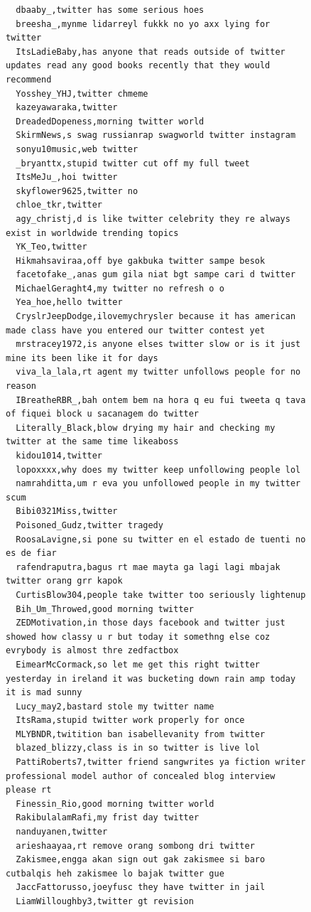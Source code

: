\begin{figure}[htpb]
\begin{verbatim}
  dbaaby_,twitter has some serious hoes
  breesha_,mynme lidarreyl fukkk no yo axx lying for twitter
  ItsLadieBaby,has anyone that reads outside of twitter updates read any good books recently that they would recommend
  Yosshey_YHJ,twitter chmeme
  kazeyawaraka,twitter
  DreadedDopeness,morning twitter world
  SkirmNews,s swag russianrap swagworld twitter instagram
  sonyu10music,web twitter
  _bryanttx,stupid twitter cut off my full tweet
  ItsMeJu_,hoi twitter
  skyflower9625,twitter no
  chloe_tkr,twitter
  agy_christj,d is like twitter celebrity they re always exist in worldwide trending topics
  YK_Teo,twitter
  Hikmahsaviraa,off bye gakbuka twitter sampe besok
  facetofake_,anas gum gila niat bgt sampe cari d twitter
  MichaelGeraght4,my twitter no refresh o o
  Yea_hoe,hello twitter
  CryslrJeepDodge,ilovemychrysler because it has american made class have you entered our twitter contest yet
  mrstracey1972,is anyone elses twitter slow or is it just mine its been like it for days
  viva_la_lala,rt agent my twitter unfollows people for no reason
  IBreatheRBR_,bah ontem bem na hora q eu fui tweeta q tava of fiquei block u sacanagem do twitter
  Literally_Black,blow drying my hair and checking my twitter at the same time likeaboss
  kidou1014,twitter
  lopoxxxx,why does my twitter keep unfollowing people lol
  namrahditta,um r eva you unfollowed people in my twitter scum
  Bibi0321Miss,twitter
  Poisoned_Gudz,twitter tragedy
  RoosaLavigne,si pone su twitter en el estado de tuenti no es de fiar
  rafendraputra,bagus rt mae mayta ga lagi lagi mbajak twitter orang grr kapok
  CurtisBlow304,people take twitter too seriously lightenup
  Bih_Um_Throwed,good morning twitter
  ZEDMotivation,in those days facebook and twitter just showed how classy u r but today it somethng else coz evrybody is almost thre zedfactbox
  EimearMcCormack,so let me get this right twitter yesterday in ireland it was bucketing down rain amp today it is mad sunny
  Lucy_may2,bastard stole my twitter name
  ItsRama,stupid twitter work properly for once
  MLYBNDR,twitition ban isabellevanity from twitter
  blazed_blizzy,class is in so twitter is live lol
  PattiRoberts7,twitter friend sangwrites ya fiction writer professional model author of concealed blog interview please rt
  Finessin_Rio,good morning twitter world
  RakibulalamRafi,my frist day twitter
  nanduyanen,twitter
  arieshaayaa,rt remove orang sombong dri twitter
  Zakismee,engga akan sign out gak zakismee si baro cutbalqis heh zakismee lo bajak twitter gue
  JaccFattorusso,joeyfusc they have twitter in jail
  LiamWilloughby3,twitter gt revision

\end{verbatim}
\end{figure}
